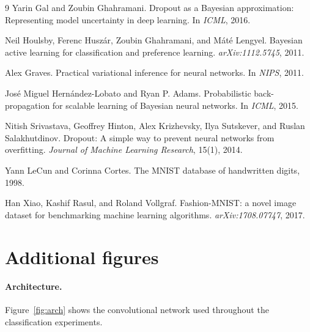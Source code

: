 \documentclass{article}
\begin{document}

\medskip
\small

\begin{thebibliography}{9}
Yarin Gal and Zoubin Ghahramani.
\newblock Dropout as a Bayesian approximation: Representing model uncertainty in deep learning.
\newblock In \emph{ICML}, 2016.

Neil Houlsby, Ferenc Husz{\'a}r, Zoubin Ghahramani, and M{\'a}t{\'e} Lengyel.
\newblock Bayesian active learning for classification and preference learning.
\newblock \emph{arXiv:1112.5745}, 2011.

Alex Graves.
\newblock Practical variational inference for neural networks.
\newblock In \emph{NIPS}, 2011.

Jos{\'e} Miguel Hern{\'a}ndez-Lobato and Ryan P. Adams.
\newblock Probabilistic back-propagation for scalable learning of Bayesian neural networks.
\newblock In \emph{ICML}, 2015.

Nitish Srivastava, Geoffrey Hinton, Alex Krizhevsky, Ilya Sutskever, and Ruslan Salakhutdinov.
\newblock Dropout: A simple way to prevent neural networks from overfitting.
\newblock \emph{Journal of Machine Learning Research}, 15(1), 2014.

Yann LeCun and Corinna Cortes.
\newblock The MNIST database of handwritten digits, 1998.

Han Xiao, Kashif Rasul, and Roland Vollgraf.
\newblock Fashion-MNIST: a novel image dataset for benchmarking machine learning algorithms.
\newblock \emph{arXiv:1708.07747}, 2017.
\end{thebibliography}


\appendix

\section{Additional figures}\label{app:figures}

\paragraph{Architecture.} Figure~\ref{fig:arch} shows the convolutional network used throughout the classification experiments.
\end{document}
